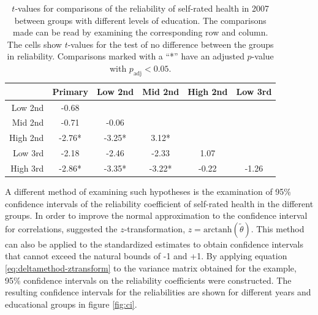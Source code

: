 \documentclass[a4paper, 11pt]{article}
\newcommand{\thetastan}{\tilde{\theta}}
\newcommand{\0}{\boldsymbol{0}}
\newcommand{\arctanh}{\mathrm{arctanh}}
\begin{document}
\begin{table}[tbh]
\begin{center}
\begin{tabular}{rccccc}
  \hline
 & Primary & Low 2nd & Mid 2nd & High 2nd & Low 3rd \\
   \hline
  Low 2nd & -0.68 \\ 
  Mid 2nd & -0.71 & -0.06  \\ 
  High 2nd & -2.76* & -3.25* &3.12*   \\ 
  Low 3rd & -2.18 & -2.46 & -2.33 & 1.07   \\ 
  High 3rd & -2.86* & -3.35* & -3.22* & -0.22 & -1.26  \\ 
   \hline
\end{tabular}\caption{$t$-values for comparisons of the reliability of self-rated health in 2007 
	 between groups with different levels of education. The comparisons made can be read 
	by examining the corresponding row and column. The cells show $t$-values for the test of no difference
	 between the groups in reliability. Comparisons marked with a ``*'' have an adjusted $p$-value
	 with $p_{\mathrm{adj}}<0.05$.}\label{tab:tests}
\end{center}
\end{table}



A different method of examining such hypotheses is the examination of 95\% confidence intervals of the reliability coefficient of self-rated health in the different groups.
In order to improve the normal approximation to the confidence interval for correlations, \cite{fisher1925statistical} suggested the $z$-transformation, $z = \arctanh(\thetastan)$. This method can also be applied to the standardized estimates to obtain confidence 
intervals that cannot exceed the natural bounds of -1 and +1. By applying equation \ref{eq:deltamethod-ztransform} to the variance
matrix obtained for the example, 95\% confidence intervals on the reliability coefficients were constructed. The resulting confidence
intervals for the reliabilities are shown for different years and educational groups in figure \ref{fig:ci}.
\end{document}
